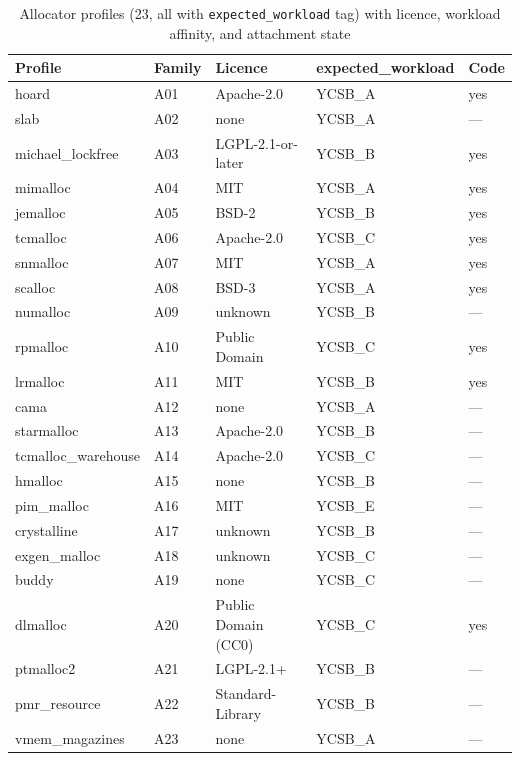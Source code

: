 \begin{table}[!htbp]
  \caption{Allocator profiles (23, all with \texttt{expected\_workload} tag) with licence, workload affinity, and attachment state}\label{tab:allocator-profiles}
  \centering\small
  \begin{tabular}{lllll}
    \toprule
    \textbf{Profile} & \textbf{Family} & \textbf{Licence} & \textbf{expected\_workload} & \textbf{Code} \\
    \midrule
    hoard & A01 & Apache-2.0 & YCSB\_A & yes \\
    slab & A02 & none & YCSB\_A & --- \\
    michael\_lockfree & A03 & LGPL-2.1-or-later & YCSB\_B & yes \\
    mimalloc & A04 & MIT & YCSB\_A & yes \\
    jemalloc & A05 & BSD-2 & YCSB\_B & yes \\
    tcmalloc & A06 & Apache-2.0 & YCSB\_C & yes \\
    snmalloc & A07 & MIT & YCSB\_A & yes \\
    scalloc & A08 & BSD-3 & YCSB\_A & yes \\
    numalloc & A09 & unknown & YCSB\_B & --- \\
    rpmalloc & A10 & Public Domain & YCSB\_C & yes \\
    lrmalloc & A11 & MIT & YCSB\_B & yes \\
    cama & A12 & none & YCSB\_A & --- \\
    starmalloc & A13 & Apache-2.0 & YCSB\_B & --- \\
    tcmalloc\_warehouse & A14 & Apache-2.0 & YCSB\_C & --- \\
    hmalloc & A15 & none & YCSB\_B & --- \\
    pim\_malloc & A16 & MIT & YCSB\_E & --- \\
    crystalline & A17 & unknown & YCSB\_B & --- \\
    exgen\_malloc & A18 & unknown & YCSB\_C & --- \\
    buddy & A19 & none & YCSB\_C & --- \\
    dlmalloc & A20 & Public Domain (CC0) & YCSB\_C & yes \\
    ptmalloc2 & A21 & LGPL-2.1+ & YCSB\_B & --- \\
    pmr\_resource & A22 & Standard-Library & YCSB\_B & --- \\
    vmem\_magazines & A23 & none & YCSB\_A & --- \\
    \bottomrule
  \end{tabular}


\end{table}

